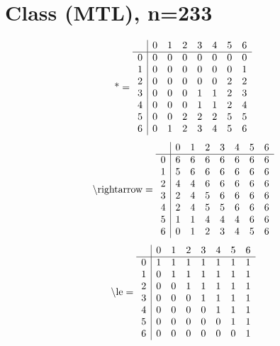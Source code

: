 \documentclass[11pt]{article}
\begin{document}
\section{Class (MTL), n=233}
\[\text{*} = 
\begin{array}{r | r r r r r r r}
 & 0 & 1 & 2 & 3 & 4 & 5 & 6 \\ \hline
0 & 0 & 0 & 0 & 0 & 0 & 0 & 0 \\
1 & 0 & 0 & 0 & 0 & 0 & 0 & 1 \\
2 & 0 & 0 & 0 & 0 & 0 & 2 & 2 \\
3 & 0 & 0 & 0 & 1 & 1 & 2 & 3 \\
4 & 0 & 0 & 0 & 1 & 1 & 2 & 4 \\
5 & 0 & 0 & 2 & 2 & 2 & 5 & 5 \\
6 & 0 & 1 & 2 & 3 & 4 & 5 & 6 \\
\end{array}
\]
\[\text{\textbackslash rightarrow} = 
\begin{array}{r | r r r r r r r}
 & 0 & 1 & 2 & 3 & 4 & 5 & 6 \\ \hline
0 & 6 & 6 & 6 & 6 & 6 & 6 & 6 \\
1 & 5 & 6 & 6 & 6 & 6 & 6 & 6 \\
2 & 4 & 4 & 6 & 6 & 6 & 6 & 6 \\
3 & 2 & 4 & 5 & 6 & 6 & 6 & 6 \\
4 & 2 & 4 & 5 & 5 & 6 & 6 & 6 \\
5 & 1 & 1 & 4 & 4 & 4 & 6 & 6 \\
6 & 0 & 1 & 2 & 3 & 4 & 5 & 6 \\
\end{array}
\]
\[\text{\textbackslash le} = 
\begin{array}{r | r r r r r r r}
 & 0 & 1 & 2 & 3 & 4 & 5 & 6 \\ \hline
0 & 1 & 1 & 1 & 1 & 1 & 1 & 1 \\
1 & 0 & 1 & 1 & 1 & 1 & 1 & 1 \\
2 & 0 & 0 & 1 & 1 & 1 & 1 & 1 \\
3 & 0 & 0 & 0 & 1 & 1 & 1 & 1 \\
4 & 0 & 0 & 0 & 0 & 1 & 1 & 1 \\
5 & 0 & 0 & 0 & 0 & 0 & 1 & 1 \\
6 & 0 & 0 & 0 & 0 & 0 & 0 & 1 \\
\end{array}
\]
\end{document}

